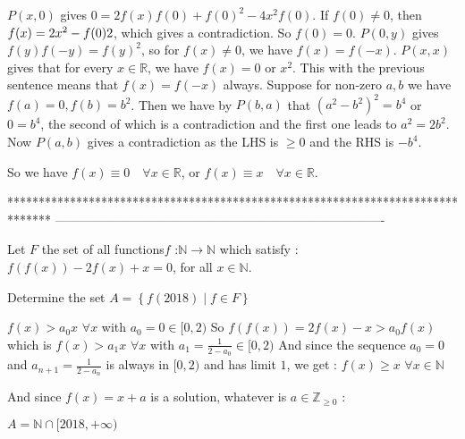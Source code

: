 \begin{solution}
	$P(x,0)$ gives $0=2f(x)f(0) + f(0)^2 - 4x^2f(0)$. If $f(0) \ne 0$, then $f(x) = 2x^2 - f(0)\/2$, which gives a contradiction. So $f(0) = 0$. 
$P(0,y)$ gives $f(y)f(-y) = f(y)^2$, so for $f(x) \ne 0$, we have $f(x) = f(-x)$. 
$P(x,x)$ gives that for every $x \in \mathbb{R}$, we have $f(x) = 0$ or $x^2$. This with the previous sentence means that $f(x) = f(-x)$ always. 
Suppose for non-zero $a,b$ we have $f(a)=0, f(b)=b^2$. Then we have by $P(b,a)$ that $(a^2-b^2)^2 = b^4$ or $0=b^4$, the second of which is a contradiction and the first one leads to $a^2=2b^2$. Now $P(a,b)$ gives a contradiction as the LHS is $\ge 0$ and the RHS is $-b^4$.

So we have $f(x) \equiv 0 \quad \forall x \in \mathbb{R}$, or $f(x) \equiv x \quad \forall x \in \mathbb{R}$.
\end{solution}
*******************************************************************************
-------------------------------------------------------------------------------




\begin{solution}
	\begin{tcolorbox}Let $F$ the set of all functions$f$ :$$$\rightarrow\mathbb{N}$
which satisfy : $f\left(f\left(x\right)\right)-2f\left(x\right)+x=0$,
for all $x\in\mathbb{N}$.

Determine the set $A=\left\{ f\left(2018\right)\mid f\in F\right\}$\end{tcolorbox}
$f(x)>a_0x$ $\forall x$ with $a_0=0\in[0,2)$
So $f(f(x))=2f(x)-x>a_0f(x)$ which is $f(x)> a_1x$ $\forall x$ with $a_1=\frac 1{2-a_0}\in[0,2)$
And since the sequence $a_0=0$ and $a_{n+1}=\frac 1{2-a_n}$ is always in $[0,2)$ and has limit $1$, we get :
$f(x)\ge x$ $\forall x\in\mathbb N$

And since $f(x)=x+a$ is a solution, whatever is $a\in\mathbb Z_{\ge 0}$ :

$\boxed{A=\mathbb N\cap[2018,+\infty)}$


\end{solution}



